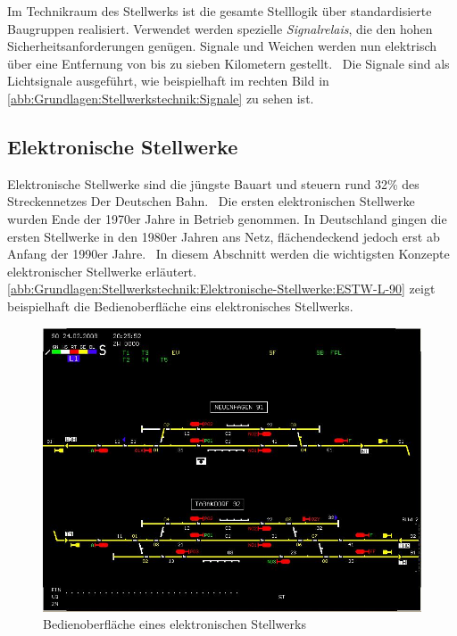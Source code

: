 Im Technikraum des Stellwerks ist die gesamte Stelllogik über standardisierte Baugruppen realisiert. Verwendet werden spezielle \textit{Signalrelais}, die den hohen Sicherheitsanforderungen genügen. Signale und Weichen werden nun elektrisch über eine Entfernung von bis zu sieben Kilometern gestellt.~\cite{bib:DB:Stellwerke} Die Signale sind als Lichtsignale ausgeführt, wie beispielhaft im rechten Bild in \autoref{abb:Grundlagen:Stellwerkstechnik:Signale} zu sehen ist.

\subsection{Elektronische Stellwerke}\label{text:Grundlagen:Stellwerkstechnik:Elektronische-Stellwerke}

Elektronische Stellwerke sind die jüngste Bauart und steuern rund 32\% des Streckennetzes Der Deutschen Bahn.~\cite{bib:DB:Stellwerke} Die ersten elektronischen Stellwerke wurden Ende der 1970er Jahre in Betrieb genommen. In Deutschland gingen die ersten Stellwerke in den 1980er Jahren ans Netz, flächendeckend jedoch erst ab Anfang der 1990er Jahre.~\cite[][S.192 f.]{bib:Sicherung-des-Schienenverkehrs} In diesem Abschnitt werden die wichtigsten Konzepte elektronischer Stellwerke erläutert. \autoref{abb:Grundlagen:Stellwerkstechnik:Elektronische-Stellwerke:ESTW-L-90} zeigt beispielhaft die Bedienoberfläche eins elektronisches Stellwerks.

\begin{figure}[H]
    \centering
    \includegraphics[width=\textwidth]{Assets/Images/2-Grundlagen/ESTW-L-90.png}
    \caption{Bedienoberfläche eines elektronischen Stellwerks~\cite{bib:bild:wiki:EST-L-90}}\label{abb:Grundlagen:Stellwerkstechnik:Elektronische-Stellwerke:ESTW-L-90}
\end{figure}

